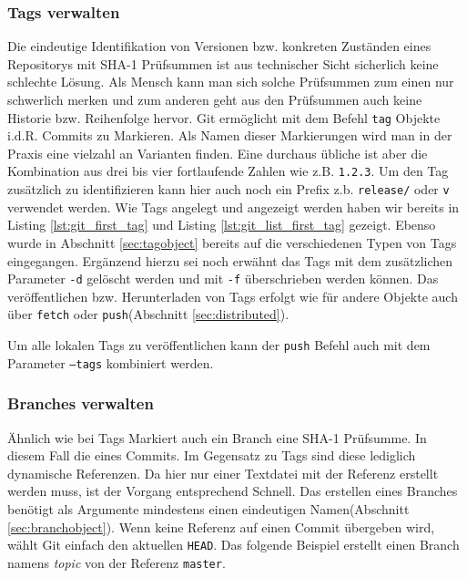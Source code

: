 \subsubsection{Tags verwalten}\label{sec:managetags}
Die eindeutige Identifikation von Versionen bzw. konkreten Zuständen eines
Repositorys mit \gls{SHA-1} Prüfsummen ist aus technischer Sicht sicherlich
keine schlechte Lösung. Als Mensch kann man sich solche Prüfsummen zum einen
nur schwerlich merken und zum anderen geht aus den Prüfsummen auch keine
Historie bzw. Reihenfolge hervor. Git ermöglicht mit dem Befehl \texttt{tag}
Objekte i.d.R.  Commits zu Markieren. Als Namen dieser Markierungen wird man in
der Praxis eine vielzahl an Varianten finden. Eine durchaus übliche ist aber
die Kombination aus drei bis vier fortlaufende Zahlen wie z.B. \texttt{1.2.3}.
Um den Tag zusätzlich zu identifizieren kann hier auch noch ein Prefix z.b.
\texttt{release/} oder \texttt{v} verwendet werden. Wie Tags angelegt und
angezeigt werden haben wir bereits in Listing \ref{lst:git_first_tag} und
Listing \ref{lst:git_list_first_tag} gezeigt. Ebenso wurde in Abschnitt
\ref{sec:tagobject} bereits auf die verschiedenen Typen von Tags eingegangen.
Ergänzend hierzu sei noch erwähnt das Tags mit dem zusätzlichen Parameter
\texttt{-d} gelöscht werden und mit \texttt{-f} überschrieben werden können.
Das veröffentlichen bzw. Herunterladen von Tags erfolgt wie für andere Objekte
auch über \texttt{fetch} oder \texttt{push}(Abschnitt \ref{sec:distributed}).



Um alle lokalen Tags zu veröffentlichen kann der \texttt{push} Befehl auch mit
dem Parameter \texttt{--tags} kombiniert werden.\cite[70-71,162-163]{gitosp}



\subsubsection{Branches verwalten} Ähnlich wie bei Tags Markiert auch ein
Branch eine \gls{SHA-1} Prüfsumme. In diesem Fall die eines Commits. Im
Gegensatz zu Tags sind diese lediglich dynamische Referenzen. Da hier nur einer
Textdatei mit der Referenz erstellt werden muss, ist der Vorgang entsprechend
Schnell. Das erstellen eines Branches benötigt als Argumente mindestens einen
eindeutigen Namen(Abschnitt \ref{sec:branchobject}). Wenn keine Referenz auf
einen Commit übergeben wird, wählt Git einfach den aktuellen \texttt{HEAD}.
Das folgende Beispiel erstellt einen Branch namens \textit{topic} von der
Referenz \texttt{master}.

